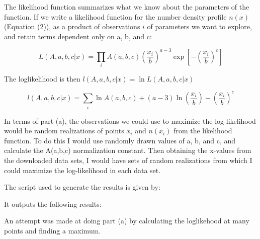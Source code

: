 

The likelihood function summarizes what we know about the parameters of the function. If we write a likelihood function for the number density profile $n(x)$ (Equation (2)), as a product of observations $i$ of parameters we want to explore, and retain terms dependent only on a, b, and c:

\begin{equation}
  L(A,a,b,c \vert x) = \prod_{i} A(a,b,c)\left(\frac{x_i}{b}\right)^{a-3}\exp\left[-\left(\frac{x_i}{b}\right)^c\right]
\end{equation}

The loglikelihood is then $l(A,a,b,c \vert x) = \ln{L(A,a,b,c \vert x)}$

\begin{equation}
  l(A,a,b,c \vert x) = \sum_{i} \ln{A(a,b,c)} + (a-3)\ln{\left(\dfrac{x_i}{b}\right)}-\left(\frac{x_i}{b}\right)^c
\end{equation}



In terms of part (a), the observations we could use to maximize the log-likelihood would be random realizations of points $x_i$ and $n(x_i)$ from the likelihood function. To do this I would use randomly drawn values of a, b, and c, and calculate the A(a,b,c) normalization constant. Then obtaining the x-values from the downloaded data sets, I would have sets of random realizations from which I could maximize the log-likelihood in each data set.


The script used to generate the results is given by:


It outputs the following results:



An attempt was made at doing part (a) by calculating the loglikehood at many points and finding a maximum.
